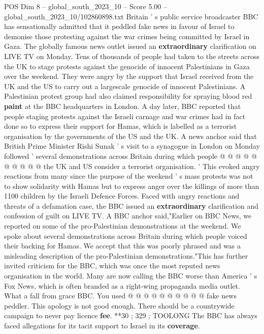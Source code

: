 \begin{textsample}{POS Dim 8 – global\_south\_2023\_10 – Score 5.00 – global\_south\_2023\_10/102860898.txt}  \label{ex:f8_pos_353}
Britain ' s public service broadcaster BBC has sensationally admitted that it peddled fake news in favour of Israel to demonise those protesting against the war crimes being committed by Israel in Gaza.
The globally famous news outlet issued an \textbf{extraordinary} clarification on LIVE TV on Monday.
Tens of thousands of people had taken to the streets across the UK to stage protests against the genocide of innocent Palestinians in Gaza over the weekend.
They were angry by the support that Israel received from the UK and the US to carry out a largescale genocide of innocent Palestinians.
A Palestinian protest group had also claimed responsibility for spraying blood red \textbf{paint} at the BBC headquarters in London.
A day later, BBC reported that people staging protests against the Israeli carnage and war crimes had in fact done so to express their support for Hamas, which is labelled as a terrorist organisation by the governments of the US and the UK.
A news anchor said that British Prime Minister Rishi Sunak ' s visit to a synagogue in London on Monday followed ' several demonstrations across Britain during which people @ @ @ @ @ @ @ @ @ @ the UK and US consider a terrorist organisation. ' This evoked angry reactions from many since the purpose of the weekend ' s mass protests was not to show solidarity with Hamas but to express anger over the killings of more than 1100 children by the Israeli Defence Forces.
Faced with angry reactions and threats of a defamation case, the BBC issued an \textbf{extraordinary} clarification and confession of guilt on LIVE TV.
A BBC anchor said,"Earlier on BBC News, we reported on some of the pro-Palestinian demonstrations at the weekend.
We spoke about several demonstrations across Britain during which people voiced their backing for Hamas.
We accept that this was poorly phrased and was a misleading description of the pro-Palestinian demonstrations."This has further invited criticism for the BBC, which was once the most reputed news organisation in the world.
Many are now calling the BBC worse than America ' s Fox News, which is often branded as a right-wing propaganda media outlet.
What a fall from grace BBC.
You used @ @ @ @ @ @ @ @ @ @ fake news peddler.
This apology is not good enough.
There should be a countrywide campaign to never pay licence \textbf{fee}. **30 ; 329 ; TOOLONG The BBC has always faced allegations for its tacit support to Israel in its \textbf{coverage}.

\end{textsample}
